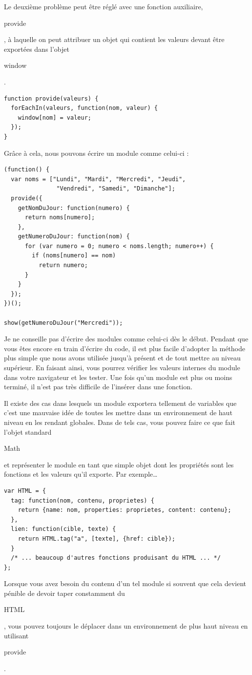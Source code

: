 \documentclass{FramateX}
\renewcommand{\texttt}[1]{\begin{sffamily}{#1}\end{sffamily}}
\begin{document}
Le deuxième problème peut être réglé avec une fonction auxiliaire,
\texttt{provide}, à laquelle on peut attribuer un objet qui contient les
valeurs devant être exportées dans l'objet \texttt{window}.

\begin{lstlisting}
function provide(valeurs) {
  forEachIn(valeurs, function(nom, valeur) {
    window[nom] = valeur;
  });
}
\end{lstlisting}
Grâce à cela, nous pouvons écrire un module comme celui-ci :

\begin{lstlisting}
(function() {
  var noms = ["Lundi", "Mardi", "Mercredi", "Jeudi",
               "Vendredi", "Samedi", "Dimanche"];
  provide({
    getNomDuJour: function(numero) {
      return noms[numero];
    },
    getNumeroDuJour: function(nom) {
      for (var numero = 0; numero < noms.length; numero++) {
        if (noms[numero] == nom)
          return numero;
      }
    }
  });
})();

show(getNumeroDuJour("Mercredi"));
\end{lstlisting}
Je ne conseille pas d'écrire des modules comme celui-ci dès le début.
Pendant que vous êtes encore en train d'écrire du code, il est plus
facile d'adopter la méthode plus simple que nous avons utilisée jusqu'à
présent et de tout mettre au niveau supérieur. En faisant ainsi, vous
pourrez vérifier les valeurs internes du module dans votre navigateur et
les tester. Une fois qu'un module est plus ou moins terminé, il n'est
pas très difficile de l'insérer dans une fonction.

\begin{center}\end{center}

Il existe des cas dans lesquels un module exportera tellement de
variables que c'est une mauvaise idée de toutes les mettre dans un
environnement de haut niveau en les rendant globales. Dans de tels cas,
vous pouvez faire ce que fait l'objet standard \texttt{Math} et
représenter le module en tant que simple objet dont les propriétés sont
les fonctions et les valeurs qu'il exporte. Par exemple\ldots{}

\begin{lstlisting}
var HTML = {
  tag: function(nom, contenu, proprietes) {
    return {name: nom, properties: proprietes, content: contenu};
  },
  lien: function(cible, texte) {
    return HTML.tag("a", [texte], {href: cible});
  }
  /* ... beaucoup d'autres fonctions produisant du HTML ... */
};
\end{lstlisting}
Lorsque vous avez besoin du contenu d'un tel module si souvent que cela
devient pénible de devoir taper constamment du \texttt{HTML}, vous
pouvez toujours le déplacer dans un environnement de plus haut niveau en
utilisant \texttt{provide}.
\end{document}
